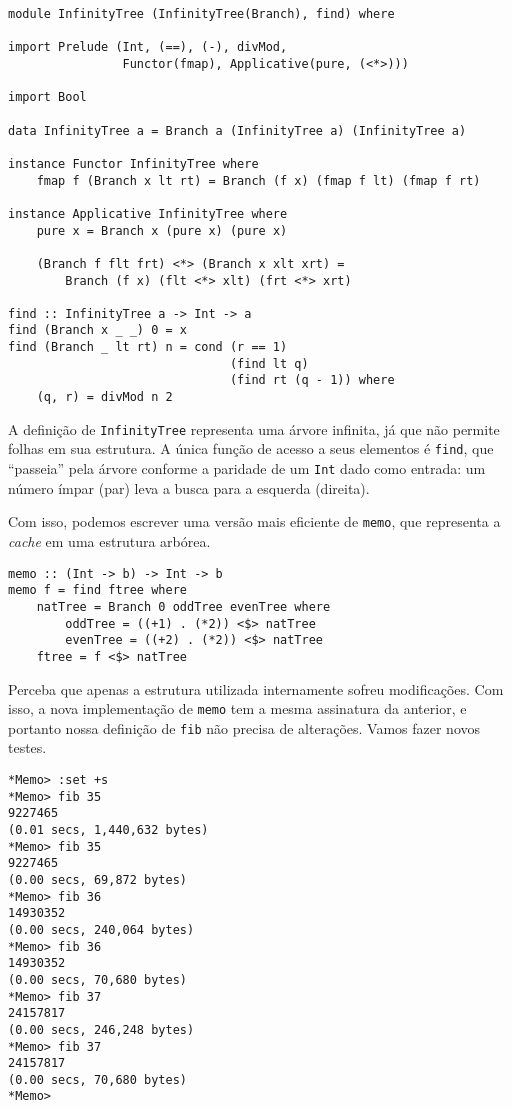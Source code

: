 \documentclass[a4paper]{article}
\begin{document}
\begin{verbatim}
module InfinityTree (InfinityTree(Branch), find) where

import Prelude (Int, (==), (-), divMod,
                Functor(fmap), Applicative(pure, (<*>)))

import Bool

data InfinityTree a = Branch a (InfinityTree a) (InfinityTree a)

instance Functor InfinityTree where
	fmap f (Branch x lt rt) = Branch (f x) (fmap f lt) (fmap f rt)

instance Applicative InfinityTree where
	pure x = Branch x (pure x) (pure x)

	(Branch f flt frt) <*> (Branch x xlt xrt) =
		Branch (f x) (flt <*> xlt) (frt <*> xrt)

find :: InfinityTree a -> Int -> a
find (Branch x _ _) 0 = x
find (Branch _ lt rt) n = cond (r == 1)
                               (find lt q)
                               (find rt (q - 1)) where
    (q, r) = divMod n 2
\end{verbatim}

A definição de \texttt{InfinityTree} representa uma árvore infinita, já que não permite folhas em sua estrutura.
A única função de acesso a seus elementos é \texttt{find}, que ``passeia'' pela árvore conforme a paridade de um \texttt{Int} dado como entrada:
um número ímpar (par) leva a busca para a esquerda (direita).

Com isso, podemos escrever uma versão mais eficiente de \texttt{memo}, que representa a \emph{cache} em uma estrutura arbórea.

\begin{verbatim}
memo :: (Int -> b) -> Int -> b
memo f = find ftree where
	natTree = Branch 0 oddTree evenTree where
		oddTree = ((+1) . (*2)) <$> natTree
		evenTree = ((+2) . (*2)) <$> natTree
	ftree = f <$> natTree
\end{verbatim}

Perceba que apenas a estrutura utilizada internamente sofreu modificações.
Com isso, a nova implementação de \texttt{memo} tem a mesma assinatura da anterior, e portanto nossa definição de \texttt{fib} não precisa de alterações.
Vamos fazer novos testes.

\pagebreak

\begin{verbatim}
*Memo> :set +s
*Memo> fib 35
9227465
(0.01 secs, 1,440,632 bytes)
*Memo> fib 35
9227465
(0.00 secs, 69,872 bytes)
*Memo> fib 36
14930352
(0.00 secs, 240,064 bytes)
*Memo> fib 36
14930352
(0.00 secs, 70,680 bytes)
*Memo> fib 37
24157817
(0.00 secs, 246,248 bytes)
*Memo> fib 37
24157817
(0.00 secs, 70,680 bytes)
*Memo>
\end{verbatim}
\end{document}
